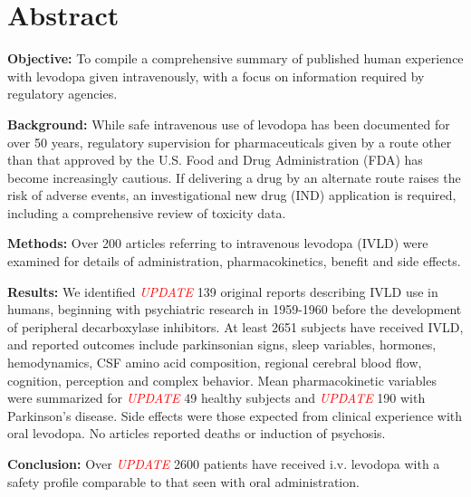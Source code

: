 \section{Abstract}
\textbf{Objective:} To compile a comprehensive summary of published human experience with levodopa given intravenously, with a focus on information required by regulatory agencies.

\textbf{Background:} While safe intravenous use of levodopa has been documented for over 50 years, regulatory supervision for pharmaceuticals given by a route other than that approved by the U.S. Food and Drug Administration (FDA) has become increasingly cautious. If delivering a drug by an alternate route raises the risk of adverse events, an investigational new drug (IND) application is required, including a comprehensive review of toxicity data.

\textbf{Methods:} Over 200 articles referring to intravenous levodopa (IVLD) were examined for details of administration, pharmacokinetics, benefit and side effects.

\textbf{Results:} We identified \textit{\textcolor{red}{UPDATE}} 139 original reports describing IVLD use in humans, beginning with psychiatric research in 1959-1960 before the development of peripheral decarboxylase inhibitors. At least 2651 subjects have received IVLD, and reported outcomes include parkinsonian signs, sleep variables, hormones, hemodynamics, CSF amino acid composition, regional cerebral blood ﬂow, cognition, perception and complex behavior. Mean pharmacokinetic variables were summarized for \textit{\textcolor{red}{UPDATE}} 49 healthy subjects and \textit{\textcolor{red}{UPDATE}} 190 with Parkinson's disease. Side effects were those expected from clinical experience with oral levodopa. No articles reported deaths or induction of psychosis.

\textbf{Conclusion:} Over \textit{\textcolor{red}{UPDATE}} 2600 patients have received i.v. levodopa with a safety profile comparable to that seen with oral administration.